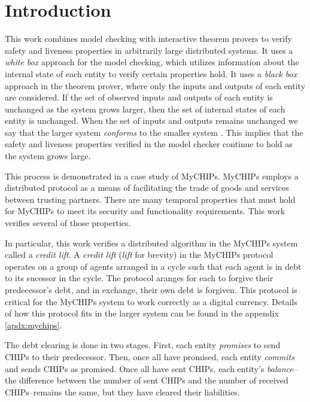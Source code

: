 \documentclass[runningheads]{llncs}
\begin{document}




\section{Introduction}
\label{chap:introduction}
This work combines model checking with interactive theorem provers to verify safety and liveness properties in arbitrarily large distributed systems.
It uses a \emph{white box} approach for the model checking, which utilizes information about the internal state of each entity to verify certain properties hold.
It uses a \emph{black box} approach in the theorem prover, where only the inputs and outputs of each entity are considered.
If the set of observed inputs and outputs of each entity is unchanged as the system grows larger, then the set of internal states of each entity is unchanged.
When the set of inputs and outputs remains unchanged we say that the larger system \emph{conforms} to the smaller system \cite{dill_trace_theory}. This implies that the safety and liveness properties verified in the model checker continue to hold as the system grows large.

This process is demonstrated in a case study of MyCHIPs. MyCHIPs employs a distributed protocol as a means of facilitating the trade of goods and services between trusting partners. There are many temporal properties that must hold for MyCHIPs to meet its security and functionality requirements. This work verifies several of those properties.

In particular, this work verifies a distributed algorithm in the MyCHIPs system called a \emph{credit lift}. A \emph{credit lift} (\emph{lift} for brevity) in the MyCHIPs protocol operates on a group of agents arranged in a cycle such that each agent is in debt to its sucessor in the cycle. The protocol aranges for each to forgive their predecessor's debt, and in exchange, their own debt is forgiven. This protocol is critical for the MyCHIPs system to work correctly as a digital currency. Details of how this protocol fits in the larger system can be found in the appendix \ref{apdx:mychips}.

The debt clearing is done in two stages. First, each entity \emph{promises} to send CHIPs to their predecessor. Then, once all have promised, each entity \emph{commits} and sends CHIPs as promised. Once all have sent CHIPs, each entity's \emph{balance}--the difference between the number of sent CHIPs and the number of received CHIPs--remains the same, but they have cleared their liabilities. 
\end{document}
